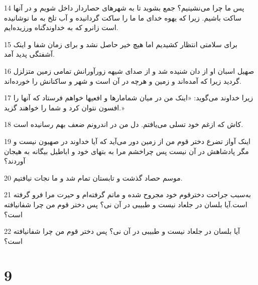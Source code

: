 \par 14 پس ما چرا می‌نشینیم؟ جمع بشوید تا به شهرهای حصاردار داخل شویم و در آنها ساکت باشیم. زیرا که یهوه خدای ما ما را ساکت گردانیده و آب تلخ به ما نوشانیده است زانرو که به خداوندگناه ورزیده‌ایم. 
\par 15 برای سلامتی انتظار کشیدیم اما هیچ خیر حاصل نشد و برای زمان شفا و اینک آشفتگی پدید آمد.
\par 16 صهیل اسبان او از دان شنیده شد و از صدای شیهه زورآورانش تمامی زمین متزلزل گردید زیرا که آمده‌اند و زمین و هرچه در آن است و شهر و ساکنانش را خورده‌اند.
\par 17 زیرا خداوند می‌گوید: «اینک من در میان شمامارها و افعیها خواهم فرستاد که آنها را افسون نتوان کرد و شما را خواهند گزید.»
\par 18 کاش که ازغم خود تسلی می‌یافتم. دل من در اندرونم ضعف بهم رسانیده است.
\par 19 اینک آواز تضرع دختر قوم من از زمین دور می‌آید که آیا خداوند در صهیون نیست و مگر پادشاهش در آن نیست پس چراخشم مرا به بتهای خود و اباطیل بیگانه به هیجان آوردند؟
\par 20 موسم حصاد گذشت و تابستان تمام شد و ما نجات نیافتیم.
\par 21 به‌سبب جراحت دخترقوم خود مجروح شده و ماتم گرفته‌ام و حیرت مرا فرو گرفته است.آیا بلسان در جلعاد نیست و طبیبی در آن نی؟ پس دختر قوم من چرا شفانیافته است؟
\par 22 آیا بلسان در جلعاد نیست و طبیبی در آن نی؟ پس دختر قوم من چرا شفانیافته است؟
 
\chapter{9}


